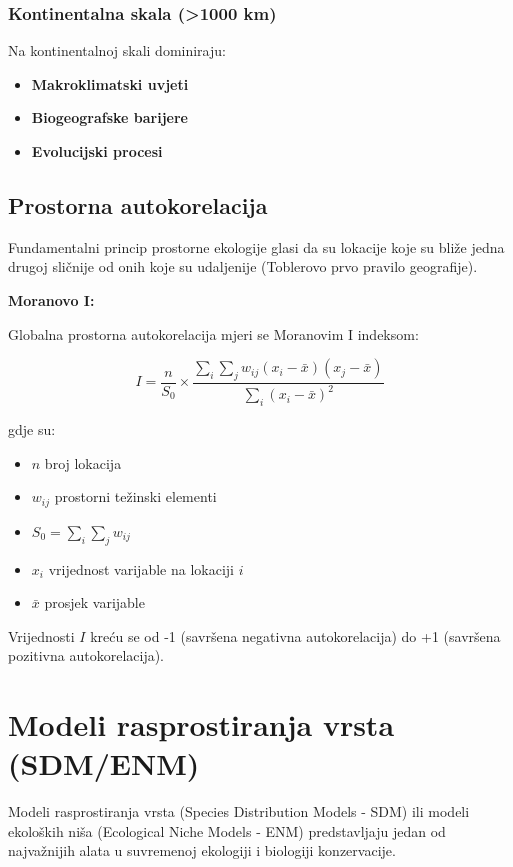 \documentclass[11pt,oneside]{book}
\begin{document}
\subsubsection{Kontinentalna skala (>1000 km)}

Na kontinentalnoj skali dominiraju:

\begin{itemize}
	\item \textbf{Makroklimatski uvjeti}
	\item \textbf{Biogeografske barijere}
	\item \textbf{Evolucijski procesi}
\end{itemize}

\subsection{Prostorna autokorelacija}

Fundamentalni princip prostorne ekologije glasi da su lokacije koje su bliže jedna drugoj sličnije od onih koje su udaljenije (Toblerovo prvo pravilo geografije).

\textbf{Moranovo I:}

Globalna prostorna autokorelacija mjeri se Moranovim I indeksom:

\begin{equation}
	I = \frac{n}{S_0} \times \frac{\sum_i \sum_j w_{ij}(x_i - \bar{x})(x_j - \bar{x})}{\sum_i (x_i - \bar{x})^2}
\end{equation}

gdje su:
\begin{itemize}
	\item $n$ broj lokacija
	\item $w_{ij}$ prostorni težinski elementi
	\item $S_0 = \sum_i \sum_j w_{ij}$
	\item $x_i$ vrijednost varijable na lokaciji $i$
	\item $\bar{x}$ prosjek varijable
\end{itemize}

Vrijednosti $I$ kreću se od -1 (savršena negativna autokorelacija) do +1 (savršena pozitivna autokorelacija).

\section{Modeli rasprostiranja vrsta (SDM/ENM)}

Modeli rasprostiranja vrsta (Species Distribution Models - SDM) ili modeli ekoloških niša (Ecological Niche Models - ENM) predstavljaju jedan od najvažnijih alata u suvremenoj ekologiji i biologiji konzervacije.
\end{document}
